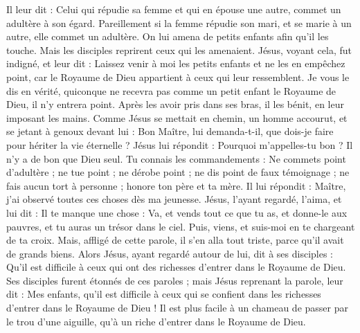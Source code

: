 \begin{multicols}{2}
Il leur dit : Celui qui répudie sa femme et qui en épouse une autre, commet un adultère à son égard.
Pareillement si la femme répudie son mari, et se marie à un autre, elle commet un adultère.
On lui amena de petits enfants afin qu'il les touche. Mais les disciples reprirent ceux qui les amenaient.
Jésus, voyant cela, fut indigné, et leur dit : Laissez venir à moi les petits enfants et ne les en empêchez point, car le Royaume de Dieu appartient à ceux qui leur ressemblent.
Je vous le dis en vérité, quiconque ne recevra pas comme un petit enfant le Royaume de Dieu, il n'y entrera point.
Après les avoir pris dans ses bras, il les bénit, en leur imposant les mains.
Comme Jésus se mettait en chemin, un homme accourut, et se jetant à genoux devant lui : Bon Maître, lui demanda-t-il, que dois-je faire pour hériter la vie éternelle ?
Jésus lui répondit : Pourquoi m'appelles-tu bon ? Il n'y a de bon que Dieu seul{}.
Tu connais les commandements : Ne commets point d’adultère ; ne tue point ; ne dérobe point ; ne dis point de faux témoignage ; ne fais aucun tort à personne ; honore ton père et ta mère.
Il lui répondit : Maître, j'ai observé toutes ces choses dès ma jeunesse.
Jésus, l’ayant regardé, l'aima, et lui dit : Il te manque une chose : Va, et vends tout ce que tu as, et donne-le aux pauvres, et tu auras un trésor dans le ciel. Puis, viens, et suis-moi en te chargeant de ta croix.
Mais, affligé de cette parole, il s'en alla tout triste, parce qu'il avait de grands biens.
Alors Jésus, ayant regardé autour de lui, dit à ses disciples : Qu’il est difficile à ceux qui ont des richesses d’entrer dans le Royaume de Dieu.
Ses disciples furent étonnés de ces paroles ; mais Jésus reprenant la parole, leur dit : Mes enfants, qu'il est difficile à ceux qui se confient dans les richesses d'entrer dans le Royaume de Dieu !
Il est plus facile à un chameau de passer par le trou d'une aiguille{}, qu’à un riche d’entrer dans le Royaume de Dieu.

\end{multicols}
